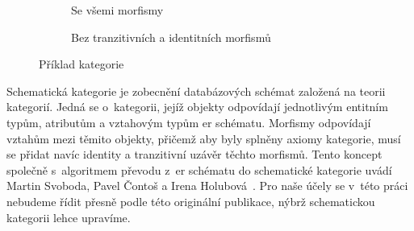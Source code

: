 \begin{figure}[!htb]
  \centering
  \begin{subfigure}{.45\textwidth}
    \centering
    \caption{Se všemi morfismy}%
    \label{fig:category-example-all}
  \end{subfigure}
  \begin{subfigure}{.45\textwidth}
    \centering
    \caption{Bez tranzitivních a identitních morfismů}%
    \label{fig:category-example-no-deduced}
  \end{subfigure}%
  \caption{Příklad kategorie}%
  \label{fig:category-example}%
\end{figure}

Schematická kategorie je zobecnění databázových schémat založená na teorii kategorií.
Jedná se o~kategorii, jejíž objekty odpovídají jednotlivým entitním typům, atributům a vztahovým typům \acrshort{er} schématu.
Morfismy odpovídají vztahům mezi těmito objekty, přičemž aby byly splněny axiomy kategorie, musí se přidat navíc identity a tranzitivní uzávěr těchto morfismů.
Tento koncept společně s~algoritmem převodu z~\acrshort{er} schématu do schematické kategorie uvádí Martin Svoboda, Pavel Čontoš a Irena Holubová~\cite{svoboda_categorical_2021}.
Pro naše účely se v~této práci nebudeme řídit přesně podle této originální publikace, nýbrž schematickou kategorii lehce upravíme.

